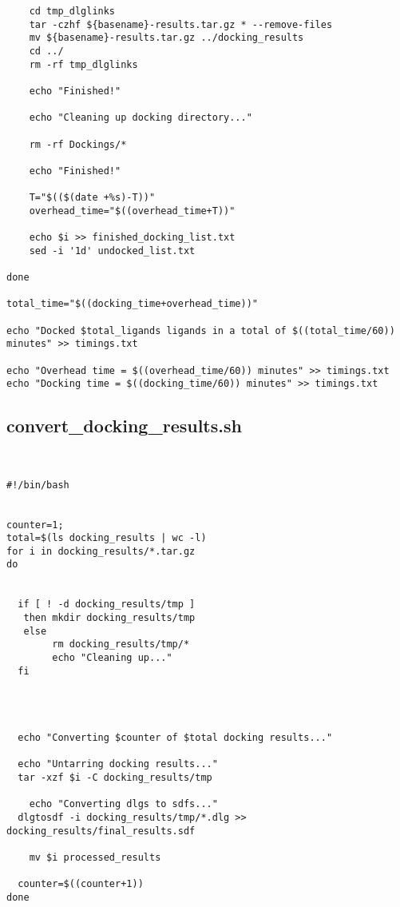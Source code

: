 \begin{changemargin}{-0.5in}{0in}
\begin{lstlisting}
	cd tmp_dlglinks
	tar -czhf ${basename}-results.tar.gz * --remove-files
	mv ${basename}-results.tar.gz ../docking_results
	cd ../
	rm -rf tmp_dlglinks

	echo "Finished!"

	echo "Cleaning up docking directory..."

	rm -rf Dockings/*

	echo "Finished!"

	T="$(($(date +%s)-T))"
	overhead_time="$((overhead_time+T))"

	echo $i >> finished_docking_list.txt
	sed -i '1d' undocked_list.txt

done	

total_time="$((docking_time+overhead_time))"
	
echo "Docked $total_ligands ligands in a total of $((total_time/60)) minutes" >> timings.txt

echo "Overhead time = $((overhead_time/60)) minutes" >> timings.txt
echo "Docking time = $((docking_time/60)) minutes" >> timings.txt

\end{lstlisting}


\end{changemargin}


\pagebreak

\subsection{convert\_docking\_results.sh}

\begin{changemargin}{-0.5in}{0in}
\begin{lstlisting}


#!/bin/bash


counter=1;
total=$(ls docking_results | wc -l)
for i in docking_results/*.tar.gz
do
  
	
  if [ ! -d docking_results/tmp ]
   then mkdir docking_results/tmp
   else 
		rm docking_results/tmp/*
		echo "Cleaning up..."
  fi

  
	
  
  echo "Converting $counter of $total docking results..."
  
  echo "Untarring docking results..."  
  tar -xzf $i -C docking_results/tmp

	echo "Converting dlgs to sdfs..."
  dlgtosdf -i docking_results/tmp/*.dlg >> docking_results/final_results.sdf

	mv $i processed_results

  counter=$((counter+1))
done
\end{lstlisting}
\end{changemargin}



